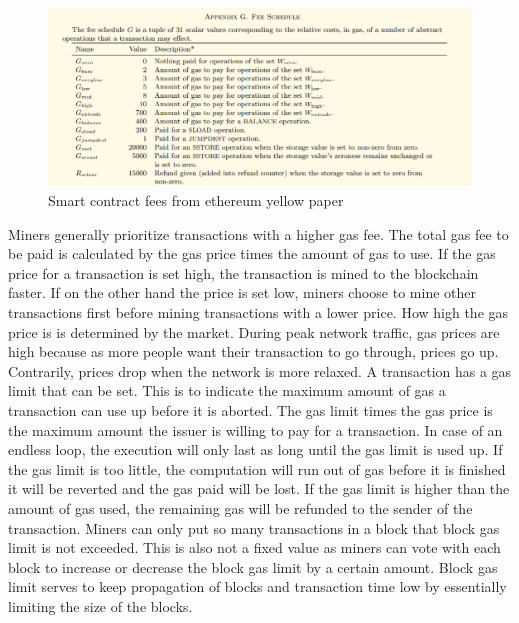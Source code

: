 \begin{figure}[ht!]
  \begin{center}
  \includegraphics[scale=0.6]{Talk7/img/smart_contracts/gas-fees}
     \end{center}
  \caption{Smart contract fees from ethereum yellow paper}
     \label{smart_contract_fees}
\end{figure}

Miners generally prioritize transactions with a higher gas fee. The total gas fee to be paid is calculated by the gas price times the amount of gas to use. If the gas price for a transaction is set high, the transaction is mined to the blockchain faster. If on the other hand the price is set low, miners choose to mine other transactions first
before mining transactions with a lower price. How high the gas price is is determined by the market. During peak network traffic, gas prices are high because as more people want their transaction to go through, prices go up. Contrarily, prices drop when the network is more relaxed.
A transaction has a gas limit that can be set. This is to indicate the maximum amount of gas a transaction can use up before it is aborted. The gas limit times the gas price is the maximum amount the issuer is willing to pay for a transaction. In case of an endless loop, the execution will only last as long until the gas limit is used up.
If the gas limit is too little, the computation will run out of gas before it is finished it will be reverted and the gas paid will be lost. If the gas limit is higher than the amount of gas used, the remaining gas will be refunded to the sender of the transaction.
Miners can only put so many transactions in a block that block gas limit is not exceeded. This is also not a fixed value as miners can vote with each block to increase or decrease the block gas limit by a certain amount. Block gas limit serves to keep propagation of blocks and transaction time low by essentially limiting the size of the blocks.


